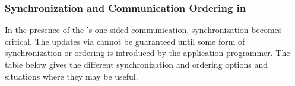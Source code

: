\subsubsection{Synchronization and Communication Ordering in \openshmem}

In the presence of the \openshmem's one-sided communication, synchronization becomes critical. The updates via  cannot be guaranteed until some form of synchronization or ordering is introduced by the application programmer. The table below gives the different synchronization and ordering options and situations where they may be useful.\\

